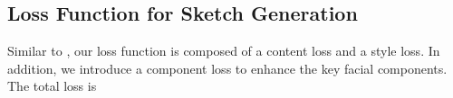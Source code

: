 \documentclass[10pt,twocolumn,letterpaper]{article}
\begin{document}



\subsection{Loss Function for Sketch Generation}

Similar to \cite{gatys2015neural}, our loss function is composed of a content loss and a style loss. In addition, we introduce a component loss to enhance the key facial components. The total loss is
\end{document}
